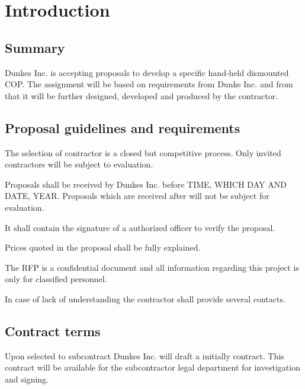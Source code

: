 \chapter{Introduction}
\section{Summary}
Dunkes Inc. is accepting proposals to develop a specific hand-held dismounted COP. The assignment will be based on requirements from Dunke Inc. and from that it will be further designed, developed and produced by the contractor.  

\section{Proposal guidelines and requirements}
The selection of contractor is a closed but competitive process. Only invited contractors will be subject to evaluation. 

Proposals shall be received by Dunkes Inc. before TIME, WHICH DAY AND DATE, YEAR. Proposals which are received after will not be subject for evaluation. 

It shall contain the signature of a authorized officer to verify the proposal. 

Prices quoted in the proposal shall be fully explained. 

The RFP is a confidential document and all information regarding this project is only for classified personnel. 

In case of lack of understanding the contractor shall provide several contacts. 

\section{Contract terms}
Upon selected to subcontract Dunkes Inc. will draft a initially contract. This contract will be available for the subcontractor legal department for investigation and 
signing. 